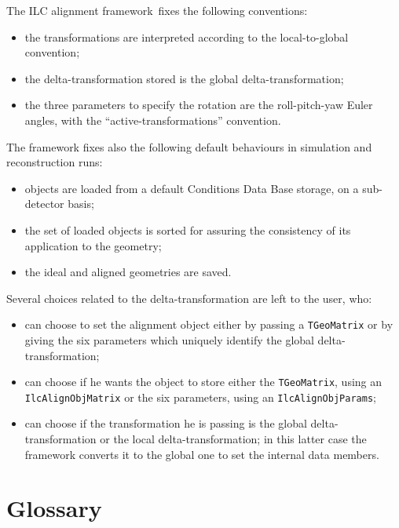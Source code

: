 \documentclass[12pt,a4paper,twoside]{article}
\newcommand{\FR}{ILC alignment framework}
\begin{document}
{The \FR\ fixes the following conventions:
\begin{itemize}
  \item the transformations are interpreted according to the
    local-to-global convention;
  \item the delta-transformation stored is the global delta-transformation;
  \item the three parameters to specify the rotation are the
   roll-pitch-yaw Euler angles, with the ``active-transformations'' convention.
\end{itemize}
The framework fixes also the following default behaviours in
simulation and reconstruction runs:
\begin{itemize}
  \item objects are loaded from a default Conditions Data Base
    storage, on a sub-detector basis;
  \item the set of loaded objects is sorted for assuring the consistency
    of its application to the geometry;
  \item the ideal and aligned geometries are saved.
\end{itemize}
Several choices related to the delta-transformation are left to the user, who:
\begin{itemize}
\item can choose to set the alignment object either by passing a
     \lstinline!TGeoMatrix! or by giving the six parameters which uniquely
     identify the global delta-transformation;
\item can choose if he wants the object to store either the
  \lstinline!TGeoMatrix!, using an \lstinline!IlcAlignObjMatrix! or the six
  parameters, using an \lstinline!IlcAlignObjParams!;
\item can choose if the transformation he is passing is the global
  delta-transformation or the local delta-transformation; in this
  latter case the framework converts it to the global one to set the
  internal data members.
\end{itemize}

\newpage
\section{Glossary}

\begin{description}


\end{description}}
\end{document}
